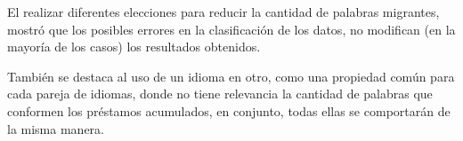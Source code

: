 El realizar diferentes elecciones para reducir la cantidad de palabras migrantes, mostró que los posibles errores en la clasificación de los datos, no modifican (en la mayoría de los casos) los resultados obtenidos. 

También se destaca al uso de un idioma en otro, como una propiedad común para cada pareja de idiomas, donde no tiene relevancia la cantidad  de palabras que conformen los préstamos acumulados,  en conjunto, todas ellas se comportarán de la misma manera. 




   






